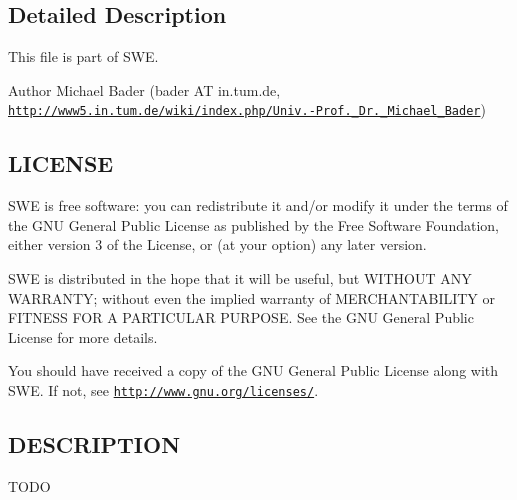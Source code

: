 \subsection{Detailed Description}
This file is part of S\-W\-E.

\begin{DoxyAuthor}{Author}
Michael Bader (bader A\-T in.\-tum.\-de, \href{http://www5.in.tum.de/wiki/index.php/Univ.-Prof._Dr._Michael_Bader}{\tt http\-://www5.\-in.\-tum.\-de/wiki/index.\-php/\-Univ.-\/\-Prof.\-\_\-\-Dr.\-\_\-\-Michael\-\_\-\-Bader})
\end{DoxyAuthor}
\hypertarget{Writer_8hh_LICENSE}{}\subsection{L\-I\-C\-E\-N\-S\-E}\label{Writer_8hh_LICENSE}
S\-W\-E is free software\-: you can redistribute it and/or modify it under the terms of the G\-N\-U General Public License as published by the Free Software Foundation, either version 3 of the License, or (at your option) any later version.

S\-W\-E is distributed in the hope that it will be useful, but W\-I\-T\-H\-O\-U\-T A\-N\-Y W\-A\-R\-R\-A\-N\-T\-Y; without even the implied warranty of M\-E\-R\-C\-H\-A\-N\-T\-A\-B\-I\-L\-I\-T\-Y or F\-I\-T\-N\-E\-S\-S F\-O\-R A P\-A\-R\-T\-I\-C\-U\-L\-A\-R P\-U\-R\-P\-O\-S\-E. See the G\-N\-U General Public License for more details.

You should have received a copy of the G\-N\-U General Public License along with S\-W\-E. If not, see \href{http://www.gnu.org/licenses/}{\tt http\-://www.\-gnu.\-org/licenses/}.\hypertarget{NetCdfWriter_8hh_DESCRIPTION}{}\subsection{D\-E\-S\-C\-R\-I\-P\-T\-I\-O\-N}\label{NetCdfWriter_8hh_DESCRIPTION}
T\-O\-D\-O 

